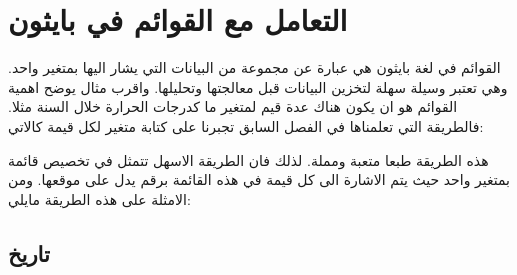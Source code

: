 \chapter{التعامل مع القوائم في بايثون}
القوائم في لغة بايثون هي عبارة عن مجموعة من البيانات التي يشار اليها بمتغير واحد. وهي تعتبر وسيلة سهلة لتخزين البيانات قبل معالجتها وتحليلها. واقرب مثال يوضح اهمية القوائم هو ان يكون هناك عدة قيم لمتغير ما كدرجات الحرارة خلال السنة مثلا. فالطريقة  التي تعلمناها في الفصل السابق تجبرنا على كتابة متغير لكل قيمة كالاتي:

\begin{english}
\end{english}

 هذه الطريقة طبعا متعبة ومملة. لذلك فان الطريقة الاسهل تتمثل في تخصيص قائمة بمتغير واحد حيث يتم الاشارة الى كل قيمة في هذه القائمة برقم يدل على موقعها. ومن الامثلة على هذه الطريقة مايلي:
\begin{english}
\end{english}
\section{تاريخ}
